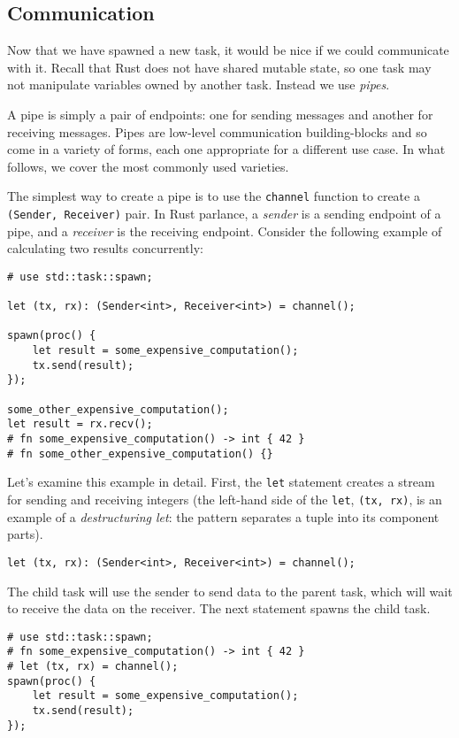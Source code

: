 \documentclass[]{article}
\begin{document}
\subsection{Communication}\label{communication}

Now that we have spawned a new task, it would be nice if we could
communicate with it. Recall that Rust does not have shared mutable
state, so one task may not manipulate variables owned by another task.
Instead we use \emph{pipes}.

A pipe is simply a pair of endpoints: one for sending messages and
another for receiving messages. Pipes are low-level communication
building-blocks and so come in a variety of forms, each one appropriate
for a different use case. In what follows, we cover the most commonly
used varieties.

The simplest way to create a pipe is to use the \texttt{channel}
function to create a \texttt{(Sender, Receiver)} pair. In Rust parlance,
a \emph{sender} is a sending endpoint of a pipe, and a \emph{receiver}
is the receiving endpoint. Consider the following example of calculating
two results concurrently:

\begin{verbatim}
# use std::task::spawn;

let (tx, rx): (Sender<int>, Receiver<int>) = channel();

spawn(proc() {
    let result = some_expensive_computation();
    tx.send(result);
});

some_other_expensive_computation();
let result = rx.recv();
# fn some_expensive_computation() -> int { 42 }
# fn some_other_expensive_computation() {}
\end{verbatim}

Let's examine this example in detail. First, the \texttt{let} statement
creates a stream for sending and receiving integers (the left-hand side
of the \texttt{let}, \texttt{(tx, rx)}, is an example of a
\emph{destructuring let}: the pattern separates a tuple into its
component parts).

\begin{verbatim}
let (tx, rx): (Sender<int>, Receiver<int>) = channel();
\end{verbatim}

The child task will use the sender to send data to the parent task,
which will wait to receive the data on the receiver. The next statement
spawns the child task.

\begin{verbatim}
# use std::task::spawn;
# fn some_expensive_computation() -> int { 42 }
# let (tx, rx) = channel();
spawn(proc() {
    let result = some_expensive_computation();
    tx.send(result);
});
\end{verbatim}
\end{document}
